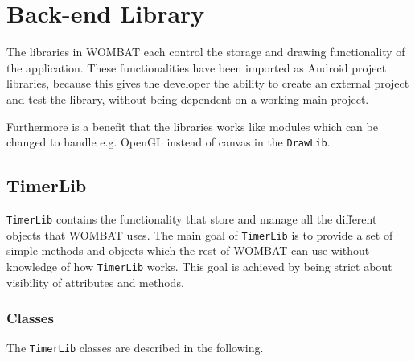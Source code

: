 \section{Back-end Library}
\label{sec:backend}
The libraries in WOMBAT each control the storage and drawing functionality of the application.
These functionalities have been imported as Android project libraries, because this gives the developer the ability to create an external project and test the library, without being dependent on a working main project.

Furthermore is a benefit that the libraries works like modules which can be changed to handle e.g. OpenGL instead of canvas in the \texttt{DrawLib}.


\subsection{TimerLib}
\texttt{TimerLib} contains the functionality that store and manage all the different objects that WOMBAT uses. The main goal of \texttt{TimerLib} is to provide a set of simple methods and objects which the rest of WOMBAT can use without knowledge of how \texttt{TimerLib} works. This goal is achieved by being strict about visibility of attributes and methods.

\subsubsection{Classes}
The \texttt{TimerLib} classes are described in the following.

